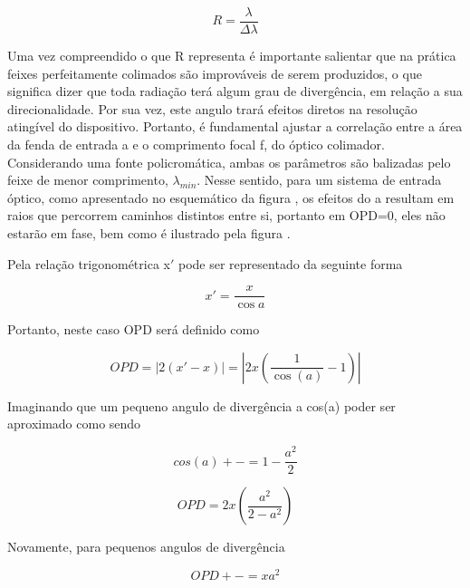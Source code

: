 \documentclass[oneside,openright,12pt]{ufsm_2021} %
\begin{document}
    \begin{equation}
        R= \frac{\lambda}{\Delta \lambda} 
    \end{equation}

    \par Uma vez compreendido o que R representa é importante salientar que na prática feixes perfeitamente colimados são improváveis de serem produzidos, o que significa dizer que toda radiação terá algum grau de divergência, em relação a sua direcionalidade. Por sua vez, este angulo \cite{Livro1} trará efeitos diretos na resolução atingível do dispositivo. Portanto, é fundamental ajustar a correlação entre a área da fenda de entrada a e o comprimento focal f, do óptico colimador. Considerando uma fonte policromática, ambas os parâmetros são balizadas pelo feixe de menor comprimento, $\lambda$$_{min}$. Nesse sentido, para um sistema de entrada óptico, como apresentado no esquemático da figura \cite{Livro1}, os efeitos do a resultam em raios que percorrem caminhos distintos entre si, portanto em OPD=0, eles não estarão em fase, bem como é ilustrado pela figura \cite{Livro2}.

    \par Pela relação trigonométrica x$'$ pode ser representado da seguinte forma

    \begin{equation}
        x'=\frac{x}{\cos a}
    \end{equation}

    \par Portanto, neste caso OPD será definido como

    \begin{equation}
        OPD = |2(x'-x)| = |2x(\frac{1}{\cos(a)}-1)|
    \end{equation}

    \par Imaginando que um pequeno angulo de divergência a \cite{LivroFT} cos(a) poder ser aproximado como sendo

    \begin{equation}
        cos(a) +-= 1-\frac{a^2}{2}
    \end{equation}

    \begin{equation}
        OPD = 2x( \frac{a^2}{2-a^2} )
    \end{equation}

    \par Novamente, para pequenos angulos de divergência

    \begin{equation}
        OPD +-= xa^2
    \end{equation}
\end{document}
